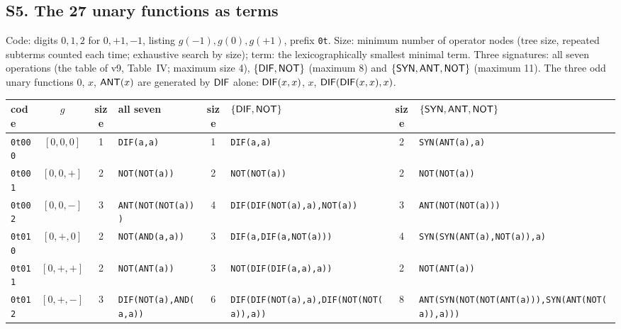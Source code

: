 \documentclass[10pt,a4paper]{article}
\begin{document}
\begin{landscape}
\section*{S5. The 27 unary functions as terms}
Code: digits $0,1,2$ for $0,+1,-1$, listing $g(-1),g(0),g(+1)$, prefix \texttt{0t}. Size: minimum number of operator nodes (tree size, repeated subterms counted each time; exhaustive search by size); term: the lexicographically smallest minimal term. Three signatures: all seven operations (the table of v9, Table~IV; maximum size 4), $\{\mathsf{DIF},\mathsf{NOT}\}$ (maximum 8) and $\{\mathsf{SYN},\mathsf{ANT},\mathsf{NOT}\}$ (maximum 11). The three odd unary functions $0$, $x$, $\mathsf{ANT}(x)$ are generated by $\mathsf{DIF}$ alone: $\mathsf{DIF}(x,x)$, $x$, $\mathsf{DIF}(\mathsf{DIF}(x,x),x)$.
\begin{center}\scriptsize\begin{longtable}{lcc>{\raggedright\arraybackslash}p{4.6cm}c>{\raggedright\arraybackslash}p{4.6cm}c>{\raggedright\arraybackslash}p{4.4cm}}
\toprule code&$g$&size&all seven&size&$\{\mathsf{DIF},\mathsf{NOT}\}$&size&$\{\mathsf{SYN},\mathsf{ANT},\mathsf{NOT}\}$\\\midrule\endhead
\texttt{0t000}&$[0,0,0]$&1&\texttt{DIF(\allowbreak a,\allowbreak a)}&1&\texttt{DIF(\allowbreak a,\allowbreak a)}&2&\texttt{SYN(\allowbreak ANT(\allowbreak a),\allowbreak a)}\\
\texttt{0t001}&$[0,0,+]$&2&\texttt{NOT(\allowbreak NOT(\allowbreak a))}&2&\texttt{NOT(\allowbreak NOT(\allowbreak a))}&2&\texttt{NOT(\allowbreak NOT(\allowbreak a))}\\
\texttt{0t002}&$[0,0,-]$&3&\texttt{ANT(\allowbreak NOT(\allowbreak NOT(\allowbreak a)))}&4&\texttt{DIF(\allowbreak DIF(\allowbreak NOT(\allowbreak a),\allowbreak a),\allowbreak NOT(\allowbreak a))}&3&\texttt{ANT(\allowbreak NOT(\allowbreak NOT(\allowbreak a)))}\\
\texttt{0t010}&$[0,+,0]$&2&\texttt{NOT(\allowbreak AND(\allowbreak a,\allowbreak a))}&3&\texttt{DIF(\allowbreak a,\allowbreak DIF(\allowbreak a,\allowbreak NOT(\allowbreak a)))}&4&\texttt{SYN(\allowbreak SYN(\allowbreak ANT(\allowbreak a),\allowbreak NOT(\allowbreak a)),\allowbreak a)}\\
\texttt{0t011}&$[0,+,+]$&2&\texttt{NOT(\allowbreak ANT(\allowbreak a))}&3&\texttt{NOT(\allowbreak DIF(\allowbreak DIF(\allowbreak a,\allowbreak a),\allowbreak a))}&2&\texttt{NOT(\allowbreak ANT(\allowbreak a))}\\
\texttt{0t012}&$[0,+,-]$&3&\texttt{DIF(\allowbreak NOT(\allowbreak a),\allowbreak AND(\allowbreak a,\allowbreak a))}&6&\texttt{DIF(\allowbreak DIF(\allowbreak NOT(\allowbreak a),\allowbreak a),\allowbreak DIF(\allowbreak NOT(\allowbreak NOT(\allowbreak a)),\allowbreak a))}&8&\texttt{ANT(\allowbreak SYN(\allowbreak NOT(\allowbreak NOT(\allowbreak ANT(\allowbreak a))),\allowbreak SYN(\allowbreak ANT(\allowbreak NOT(\allowbreak a)),\allowbreak a)))}\\

\end{longtable}
\end{center}
\end{landscape}
\end{document}
